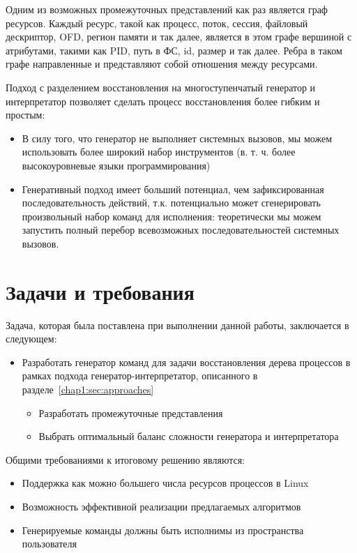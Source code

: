 Одним из возможных промежуточных представлений как раз является граф ресурсов. Каждый ресурс, такой как процесс, поток, сессия, файловый дескриптор, OFD, регион памяти и так далее, является в этом графе вершиной с атрибутами, такими как PID, путь в ФС, id, размер и так далее. Ребра в таком графе направленные и представляют собой отношения между ресурсами.

Подход с разделением восстановления на многоступенчатый генератор и интерпретатор позволяет сделать процесс восстановления более гибким и простым:
\begin{itemize}
    \item В силу того, что генератор не выполняет системных вызовов, мы можем использовать более широкий набор инструментов (в. т. ч. более высокоуровневые языки программирования)
    \item Генеративный подход имеет больший потенциал, чем зафиксированная последовательность действий, т.к. потенциально может сгенерировать произвольный набор команд для исполнения: теоретически мы можем запустить полный перебор всевозможных последовательностей системных вызовов.
\end{itemize}

\section{Задачи и требования}

Задача, которая была поставлена при выполнении данной работы, заключается в следующем:

\begin{itemize}
    \item Разработать генератор команд для задачи восстановления дерева процессов в рамках подхода генератор-интерпретатор, описанного в разделе~\ref{chap1:sec:approaches}
    \begin{itemize}
        \item Разработать промежуточные представления
        \item Выбрать оптимальный баланс сложности генератора и интерпретатора
    \end{itemize}
\end{itemize}

Общими требованиями к итоговому решению являются:
\begin{itemize}
    \item Поддержка как можно большего числа ресурсов процессов в Linux
    \item Возможность эффективной реализации предлагаемых алгоритмов
    \item Генерируемые команды должны быть исполнимы из пространства пользователя
\end{itemize}

